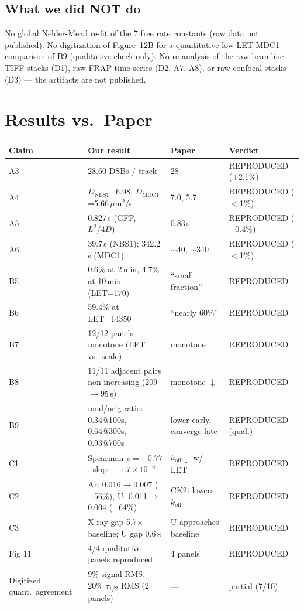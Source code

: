 \documentclass[11pt]{article}
\begin{document}
\subsection{What we did NOT do}
No global Nelder-Mead re-fit of the 7 free rate constants (raw data not published). No
digitization of Figure~12B for a quantitative low-LET MDC1 comparison of B9 (qualitative check
only). No re-analysis of the raw beamline TIFF stacks (D1), raw FRAP time-series (D2, A7, A8),
or raw confocal stacks (D3) --- the artifacts are not published.

\section{Results vs.\ Paper}

\begin{longtable}{p{2cm}p{7cm}p{3cm}p{2.5cm}}
\toprule
\textbf{Claim} & \textbf{Our result} & \textbf{Paper} & \textbf{Verdict} \\
\midrule
\endhead
A3 & 28.60 DSBs / track & 28 & REPRODUCED (+2.1\%) \\
A4 & $D_\mathrm{NBS1}$=6.98, $D_\mathrm{MDC1}$=5.66\,$\mu$m$^2$/s & 7.0, 5.7 & REPRODUCED ($<$1\%) \\
A5 & 0.827\,s (GFP, $L^2/4D$) & 0.83\,s & REPRODUCED ($-$0.4\%) \\
A6 & 39.7\,s (NBS1); 342.2\,s (MDC1) & $\sim$40, $\sim$340 & REPRODUCED ($<$1\%) \\
B5 & 0.6\% at 2\,min, 4.7\% at 10\,min (LET=170) & ``small fraction'' & REPRODUCED \\
B6 & 59.4\% at LET=14350 & ``nearly 60\%'' & REPRODUCED \\
B7 & 12/12 panels monotone (LET vs.\ scale) & monotone & REPRODUCED \\
B8 & 11/11 adjacent pairs non-increasing (209$\to$95\,s) & monotone $\downarrow$ & REPRODUCED \\
B9 & mod/orig ratio: 0.34@100s, 0.64@300s, 0.93@700s & lower early, converge late & REPRODUCED (qual.) \\
C1 & Spearman $\rho=-0.77$, slope $-1.7\times10^{-6}$ & $k_\mathrm{off}\downarrow$ w/ LET & REPRODUCED \\
C2 & Ar: 0.016$\to$0.007 ($-$56\%), U: 0.011$\to$0.004 ($-$64\%) & CK2i lowers $k_\mathrm{off}$ & REPRODUCED \\
C3 & X-ray gap 5.7$\times$ baseline; U gap 0.6$\times$ & U approaches baseline & REPRODUCED \\
\midrule
Fig 11 & 4/4 qualitative panels reproduced & 4 panels & REPRODUCED \\
Digitized quant.\ agreement & 9\% signal RMS, 20\% $\tau_{1/2}$ RMS (2 panels) & --- & partial (7/10) \\
\bottomrule
\end{longtable}
\end{document}
